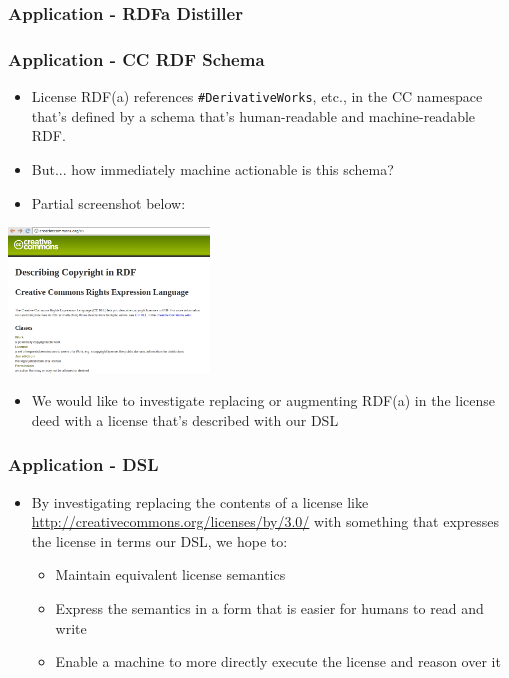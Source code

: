 \documentclass[t, xcolor=dvipsnames, handout, 10pt]{beamer}
\begin{document}
\begin{frame}[fragile]
\frametitle{Application - RDFa Distiller}

\end{frame}

\begin{frame}[t]
\frametitle{Application - CC RDF Schema}
        \begin{itemize}
            \item License RDF(a) references \texttt{\#DerivativeWorks}, etc.,
            in the CC namespace that's defined by a schema that's
            human-readable and machine-readable RDF.
            \item But... how immediately machine actionable is this schema?
            \item Partial screenshot below:
        \end{itemize}
        \begin{center}
            \includegraphics[width=0.4\textwidth]{resources/cc/schema-screenshot-partial.png}
        \end{center}
        \begin{itemize}
            \item We would like to investigate replacing or augmenting RDF(a)
            in the license deed with a license that's described with our DSL
        \end{itemize}
\end{frame}

\begin{frame}[t]
\frametitle{Application - DSL}
    \begin{itemize}
        \item By investigating replacing the contents of a license like
        \url{http://creativecommons.org/licenses/by/3.0/} with something that
        expresses the license in terms our DSL, we hope to:
        \begin{itemize}
            \item Maintain equivalent license semantics
            \item Express the semantics in a form that is easier for humans to read and write
            \item Enable a machine to more directly execute the license and reason over it
        \end{itemize}
    \end{itemize}
\end{frame}
\end{document}
